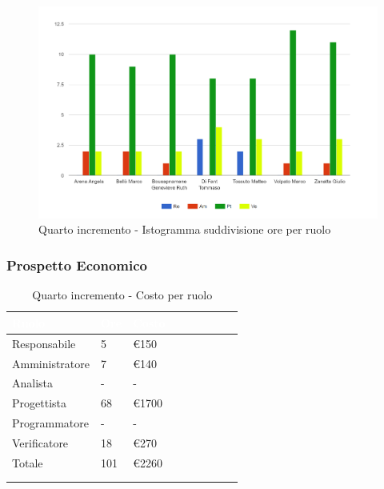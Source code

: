 {{      \begin{figure}[H]
        \includegraphics[width=15cm]{sezioni/Images/quarto.png}
        \centering
        \caption{Quarto incremento - Istogramma suddivisione ore per ruolo}
     \end{figure}
    }

    \subsubsection{Prospetto Economico}
    {
        \setlength{\freewidth}{\dimexpr\textwidth-30\tabcolsep}
        \renewcommand{\arraystretch}{1.0}
        \setlength{\aboverulesep}{0pt}
        \setlength{\belowrulesep}{0pt}
        \begin{longtable}{C{.4\freewidth} C{.2\freewidth} C{.2\freewidth} C{.2\freewidth} C{.2\freewidth} C{.2\freewidth} C{.2\freewidth} C{.2\freewidth} C{.2\freewidth}}
          \toprule
        \textcolor{white}{\textbf{Ruolo}}&
        \textcolor{white}{\textbf{Ore}}&
        \textcolor{white}{\textbf{Costo}}\\
        \toprule
        \endhead
            
        Responsabile  & 5 & €150\\
        Amministratore  & 7& €140 \\
        Analista &- & -\\
        Progettista &68 &€1700\\
        Programmatore &- & -\\
        Verificatore &18 &€270\\
        Totale&101&€2260\\
        \bottomrule
      \\
        \caption{Quarto incremento - Costo per ruolo}


\end{longtable}}}
